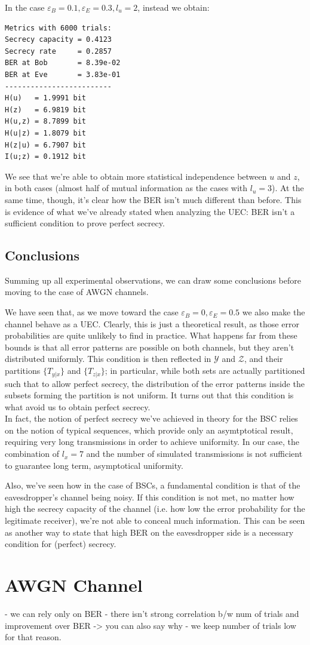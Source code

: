 \documentclass[a4paper,12pt,titlepage]{article}
\begin{document}
In the case $\varepsilon_B = 0.1, \varepsilon_E = 0.3, l_u = 2$, instead we
obtain:
\begin{verbatim}
Metrics with 6000 trials:
Secrecy capacity = 0.4123
Secrecy rate     = 0.2857
BER at Bob       = 8.39e-02
BER at Eve       = 3.83e-01
-------------------------
H(u)   = 1.9991 bit
H(z)   = 6.9819 bit
H(u,z) = 8.7899 bit
H(u|z) = 1.8079 bit
H(z|u) = 6.7907 bit
I(u;z) = 0.1912 bit
\end{verbatim}

We see that we're able to obtain more statistical independence between $u$ and
$z$, in both cases (almost half of mutual information as the cases with $l_u
=3$). At the same time, though, it's clear how the BER isn't much different
than before. This is evidence of what we've already stated when analyzing the
UEC: BER isn't a sufficient condition to prove perfect secrecy.

\subsection*{Conclusions}
Summing up all experimental observations, we can draw some conclusions before
moving to the case of AWGN channels.

We have seen that, as we move toward the case $\varepsilon_B = 0, \varepsilon_E
= 0.5$ we also make the channel behave as a UEC. Clearly, this is just a
theoretical result, as those error probabilities are quite unlikely to find in
practice. What happens far from these bounds is that all error patterns are
possible on both channels, but they aren't distributed uniformly. This
condition is then reflected in $\mathcal{Y}$ and $\mathcal{Z}$, and their
partitions $\{T_{y|x}\}$ and $\{T_{z|x}\}$; in particular, while both sets are
actually partitioned such that to allow perfect secrecy, the distribution of
the error patterns inside the subsets forming the partition is not uniform. It
turns out that this condition is what avoid us to obtain perfect secrecy. \\
In fact, the notion of perfect secrecy we've achieved in theory for the BSC
relies on the notion of typical sequences, which provide only an asymtptotical
result, requiring very long transmissions in order to achieve uniformity. In
our case, the combination of $l_x = 7$ and the number of simulated
transmissions is not sufficient to guarantee long term, asymptotical
uniformity.

Also, we've seen how in the case of BSCs, a fundamental condition is that of
the eavesdropper's channel being noisy. If this condition is not met, no matter
how high the secrecy capacity of the channel (i.e. how low the error
probability for the legitimate receiver), we're not able to conceal much
information. This can be seen as another way to state that high BER on the
eavesdropper side is a necessary condition for (perfect) secrecy.

\section{AWGN Channel}

- we can rely only on BER
- there isn't strong correlation b/w num of trials and improvement over BER ->
you can also say why
- we keep number of trials low for that reason.
\end{document}
